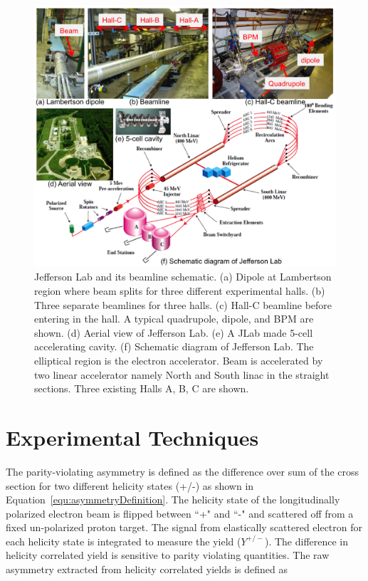 \begin{singlespace}
\begin{figure}[!h]
	\begin{center}
	\includegraphics[width=15.0cm]{figures/jlab}
	\end{center}
	\caption
	{Jefferson Lab and its beamline schematic. (a) Dipole at Lambertson region where beam splits for three different experimental halls. (b) Three separate beamlines for three halls. (c) Hall-C beamline before entering in the hall. A typical quadrupole, dipole, and BPM are shown. (d) Aerial view of Jefferson Lab. (e) A JLab made 5-cell accelerating cavity. (f) Schematic diagram of Jefferson Lab. The elliptical region is the electron accelerator. Beam is accelerated by two linear accelerator namely North and South linac in the straight sections. Three existing Halls A, B, C are shown.}
	\label{fig:jlab}
\end{figure}
\end{singlespace}

\section{Experimental Techniques}%
\label{Experimental Techniques}

The parity-violating asymmetry is defined as the difference over sum of the cross section for two different helicity states (+/-) as shown in Equation~\ref{equ:asymmetryDefinition}. The helicity state of the longitudinally polarized electron beam is flipped between ``+" and ``-" and scattered off from a fixed un-polarized proton target. The signal from elastically scattered electron for each helicity state is integrated to measure the yield ($Y^{+/-}$). The difference in helicity correlated yield is sensitive to parity violating quantities. The raw asymmetry extracted from helicity correlated yields is defined as

